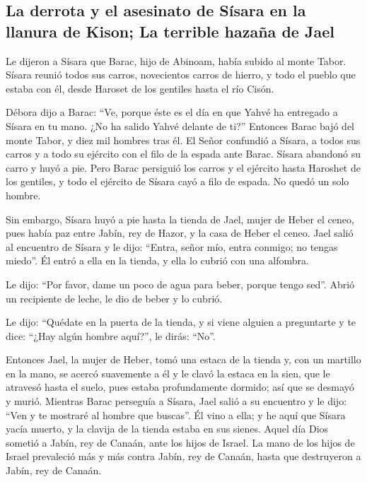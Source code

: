 \begin{paracol}{2}
{\subsection{La derrota y el asesinato de Sísara en la llanura de Kison;
La terrible hazaña de
Jael}\label{la-derrota-y-el-asesinato-de-suxedsara-en-la-llanura-de-kison-la-terrible-hazauxf1a-de-jael}}

 Le dijeron a Sísara que Barac, hijo de Abinoam, había
subido al monte Tabor.  Sísara reunió todos sus carros,
novecientos carros de hierro, y todo el pueblo que estaba con él, desde
Haroset de los gentiles hasta el río Cisón.

 Débora dijo a Barac: ``Ve, porque éste es el día en que
Yahvé ha entregado a Sísara en tu mano. ¿No ha salido Yahvé delante de
ti?'' Entonces Barac bajó del monte Tabor, y diez mil hombres tras él.
 El Señor confundió a Sísara, a todos sus carros y a todo
su ejército con el filo de la espada ante Barac. Sísara abandonó su
carro y huyó a pie.  Pero Barac persiguió los carros y el
ejército hasta Haroshet de los gentiles, y todo el ejército de Sísara
cayó a filo de espada. No quedó un solo hombre.

 Sin embargo, Sísara huyó a pie hasta la tienda de Jael,
mujer de Heber el ceneo, pues había paz entre Jabín, rey de Hazor, y la
casa de Heber el ceneo.  Jael salió al encuentro de
Sísara y le dijo: ``Entra, señor mío, entra conmigo; no tengas miedo''.
Él entró a ella en la tienda, y ella lo cubrió con una alfombra.

 Le dijo: ``Por favor, dame un poco de agua para beber,
porque tengo sed''. Abrió un recipiente de leche, le dio de beber y lo
cubrió.

 Le dijo: ``Quédate en la puerta de la tienda, y si viene
alguien a preguntarte y te dice: ``¿Hay algún hombre aquí?'', le dirás:
``No''.

 Entonces Jael, la mujer de Heber, tomó una estaca de la
tienda y, con un martillo en la mano, se acercó suavemente a él y le
clavó la estaca en la sien, que le atravesó hasta el suelo, pues estaba
profundamente dormido; así que se desmayó y murió. 
Mientras Barac perseguía a Sísara, Jael salió a su encuentro y le dijo:
``Ven y te mostraré al hombre que buscas''. Él vino a ella; y he aquí
que Sísara yacía muerto, y la clavija de la tienda estaba en sus sienes.
 Aquel día Dios sometió a Jabín, rey de Canaán, ante los
hijos de Israel.  La mano de los hijos de Israel
prevaleció más y más contra Jabín, rey de Canaán, hasta que destruyeron
a Jabín, rey de Canaán.


\end{paracol}
